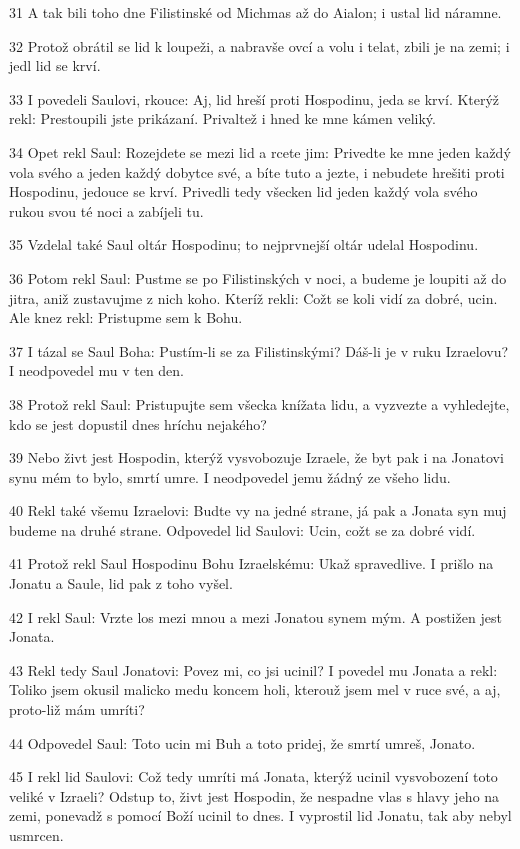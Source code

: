 \par 31 A tak bili toho dne Filistinské od Michmas až do Aialon; i ustal lid náramne.
\par 32 Protož obrátil se lid k loupeži, a nabravše ovcí a volu i telat, zbili je na zemi; i jedl lid se krví.
\par 33 I povedeli Saulovi, rkouce: Aj, lid hreší proti Hospodinu, jeda se krví. Kterýž rekl: Prestoupili jste prikázaní. Privaltež i hned ke mne kámen veliký.
\par 34 Opet rekl Saul: Rozejdete se mezi lid a rcete jim: Privedte ke mne jeden každý vola svého a jeden každý dobytce své, a bíte tuto a jezte, i nebudete hrešiti proti Hospodinu, jedouce se krví. Privedli tedy všecken lid jeden každý vola svého rukou svou té noci a zabíjeli tu.
\par 35 Vzdelal také Saul oltár Hospodinu; to nejprvnejší oltár udelal Hospodinu.
\par 36 Potom rekl Saul: Pustme se po Filistinských v noci, a budeme je loupiti až do jitra, aniž zustavujme z nich koho. Kteríž rekli: Cožt se koli vidí za dobré, ucin. Ale knez rekl: Pristupme sem k Bohu.
\par 37 I tázal se Saul Boha: Pustím-li se za Filistinskými? Dáš-li je v ruku Izraelovu? I neodpovedel mu v ten den.
\par 38 Protož rekl Saul: Pristupujte sem všecka knížata lidu, a vyzvezte a vyhledejte, kdo se jest dopustil dnes hríchu nejakého?
\par 39 Nebo živt jest Hospodin, kterýž vysvobozuje Izraele, že byt pak i na Jonatovi synu mém to bylo, smrtí umre. I neodpovedel jemu žádný ze všeho lidu.
\par 40 Rekl také všemu Izraelovi: Budte vy na jedné strane, já pak a Jonata syn muj budeme na druhé strane. Odpovedel lid Saulovi: Ucin, cožt se za dobré vidí.
\par 41 Protož rekl Saul Hospodinu Bohu Izraelskému: Ukaž spravedlive. I prišlo na Jonatu a Saule, lid pak z toho vyšel.
\par 42 I rekl Saul: Vrzte los mezi mnou a mezi Jonatou synem mým. A postižen jest Jonata.
\par 43 Rekl tedy Saul Jonatovi: Povez mi, co jsi ucinil? I povedel mu Jonata a rekl: Toliko jsem okusil malicko medu koncem holi, kterouž jsem mel v ruce své, a aj, proto-liž mám umríti?
\par 44 Odpovedel Saul: Toto ucin mi Buh a toto pridej, že smrtí umreš, Jonato.
\par 45 I rekl lid Saulovi: Což tedy umríti má Jonata, kterýž ucinil vysvobození toto veliké v Izraeli? Odstup to, živt jest Hospodin, že nespadne vlas s hlavy jeho na zemi, ponevadž s pomocí Boží ucinil to dnes. I vyprostil lid Jonatu, tak aby nebyl usmrcen.
